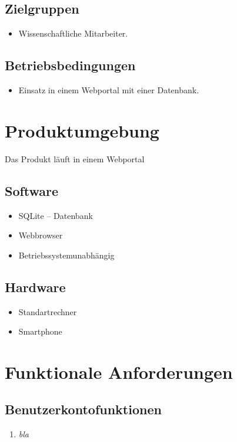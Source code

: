 \documentclass[parskip=full,11pt]{scrartcl}
\def\threedigits#1{%
  \ifnum#1<10 0\fi
  \ifnum#1<1 0\fi
  \number#1}
\begin{document}
\subsection{Zielgruppen}
\begin{itemize}[itemsep=0pt]
\item Wissenschaftliche Mitarbeiter. %
\end{itemize}

\subsection{Betriebsbedingungen}
\begin{itemize}[itemsep=0pt]
\item Einsatz in einem Webportal mit einer Datenbank.
\end{itemize}


\section{Produktumgebung}
Das Produkt läuft in einem Webportal %

\subsection{Software}
\begin{itemize}[itemsep=0pt]
\item SQLite – Datenbank
\item Webbrowser
\item Betriebssystemunabhängig
\end{itemize}

\subsection{Hardware}
\begin{itemize}[itemsep=0pt]
\item Standartrechner
\item Smartphone
\end{itemize}


\section{Funktionale Anforderungen}
\subsection{Benutzerkontofunktionen}
\begin{enumerate}[label={\textbf{/F\protect\threedigits{\theenumi}0/}}, leftmargin=*]
\item \textit{bla}

\end{enumerate}
\end{document}
